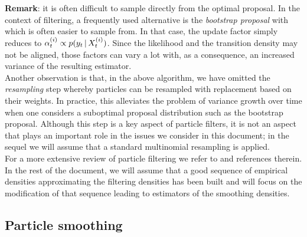 \noi\textbf{Remark}: it is often difficult to sample directly from the optimal proposal. In the context of filtering, a frequently used alternative is the \emph{bootstrap proposal} with 
which is often easier to sample from. In that case, the update factor simply reduces to $\alpha^{(i)}_t \propto p(y_t\,|\, X^{(i)}_t)$. Since the likelihood and the transition density may not be aligned, those factors can vary a lot with, as a consequence, an increased variance of the resulting estimator.\\


Another observation is that, in the above algorithm, we have omitted the \emph{resampling} step whereby particles can be resampled with replacement based on their weights. In practice, this alleviates the problem of variance growth over time when one considers a suboptimal proposal distribution such as the bootstrap proposal. Although this step is a key aspect of particle filters, it is not an aspect that plays an important role in the issues we consider in this document; in the sequel we will assume that a standard multinomial resampling is applied. \\

For a more extensive review of particle filtering we refer to \cite{doucet11} and references therein. In the rest of the document, we will assume that a good sequence of empirical densities approximating the filtering densities has been built and will focus on the modification of that sequence leading to estimators of the smoothing densities.
\subsection{Particle smoothing}

